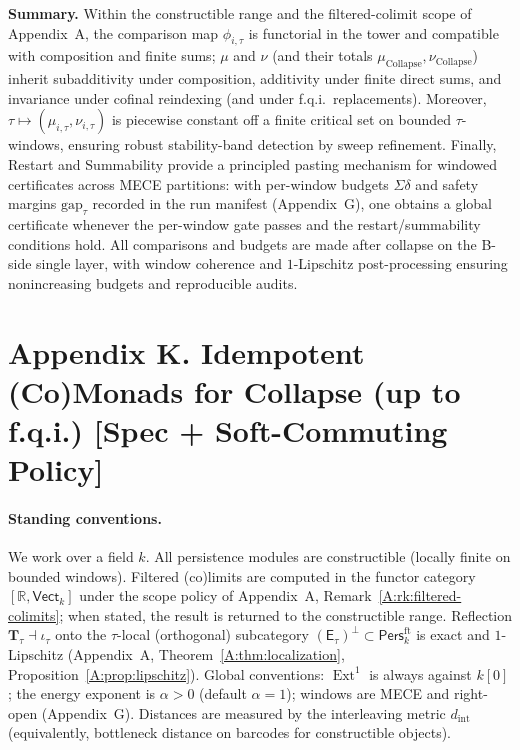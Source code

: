\documentclass[11pt]{article}
\numberwithin{equation}{section}
\theoremstyle{plain}
\theoremstyle{definition}
\theoremstyle{remark}
\DeclareMathOperator{\Ext}{Ext}
\DeclareRobustCommand{\hyp}{\nobreakdash-}
\newcommand{\Pers}{\mathsf{Pers}}
\theoremstyle{plain}
\theoremstyle{definition}
\numberwithin{equation}{section}
\theoremstyle{definition}
\DeclareRobustCommand{\muc}{\mu_{\mathrm{Collapse}}}
\DeclareRobustCommand{\nuc}{\nu_{\mathrm{Collapse}}}
\numberwithin{equation}{section}
\theoremstyle{plain}
\theoremstyle{definition}
\theoremstyle{remark}
\providecommand{\muc}{\mu_{\mathrm{Collapse}}}
\providecommand{\nuc}{\nu_{\mathrm{Collapse}}}
\begin{document}
\medskip
\noindent\textbf{Summary.}
Within the constructible range and the filtered-colimit scope of Appendix~A, the comparison map \(\phi_{i,\tau}\) is functorial in the tower and compatible with composition and finite sums; \(\mu\) and \(\nu\) (and their totals \(\muc,\nuc\)) inherit subadditivity under composition, additivity under finite direct sums, and invariance under cofinal reindexing (and under f.q.i.\ replacements).
Moreover, \(\tau\mapsto(\mu_{i,\tau},\nu_{i,\tau})\) is piecewise constant off a finite critical set on bounded \(\tau\)-windows, ensuring robust stability-band detection by sweep refinement.
Finally, Restart and Summability provide a principled pasting mechanism for windowed certificates across MECE partitions: with per-window budgets \(\Sigma\delta\) and safety margins \(\mathrm{gap}_\tau\) recorded in the run manifest (Appendix~G), one obtains a global certificate whenever the per-window gate passes and the restart/summability conditions hold.
All comparisons and budgets are made after collapse on the B-side single layer, with window coherence and \(1\)-Lipschitz post-processing ensuring nonincreasing budgets and reproducible audits.



\section*{Appendix K. Idempotent (Co)Monads for Collapse (up to f.q.i.) [Spec + Soft-Commuting Policy]}
\label{K:monads}

\paragraph{Standing conventions.}
We work over a field \(k\).
All persistence modules are constructible (locally finite on bounded windows).
Filtered (co)limits are computed in the functor category \([\mathbb{R},\mathsf{Vect}_k]\) under the scope policy of Appendix~A, Remark~\ref{A:rk:filtered-colimits}; when stated, the result is returned to the constructible range.
Reflection \(\mathbf{T}_\tau\dashv \iota_\tau\) onto the \(\tau\)\hyp local (orthogonal) subcategory \((\mathsf{E}_\tau)^\perp\subset \Pers^{\mathrm{ft}}_k\) is exact and \(1\)\hyp Lipschitz (Appendix~A, Theorem~\ref{A:thm:localization}, Proposition~\ref{A:prop:lipschitz}).
Global conventions: \(\Ext^1\) is always against \(k[0]\); the energy exponent is \(\alpha>0\) (default \(\alpha=1\)); windows are MECE and right\hyp open (Appendix~G).
Distances are measured by the interleaving metric \(d_{\mathrm{int}}\) (equivalently, bottleneck distance on barcodes for constructible objects).
\end{document}
